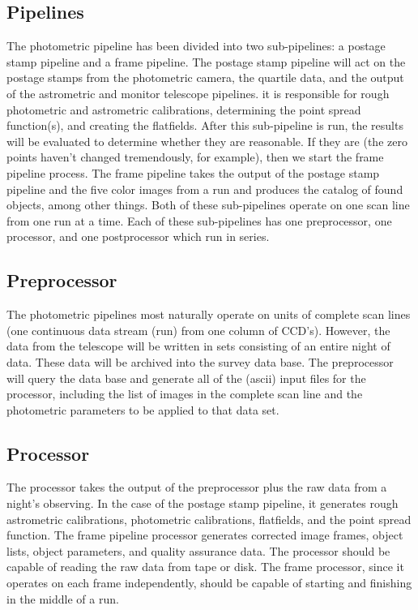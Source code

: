 \subsection{Pipelines}

	The photometric pipeline has been divided into two sub-pipelines:
a postage stamp pipeline and a frame pipeline.  The postage stamp pipeline
will act on the postage stamps from the photometric camera, the quartile
data, and the output of the astrometric and monitor telescope pipelines.
it is responsible for rough photometric and astrometric calibrations,
determining the point spread function(s), and creating the flatfields.
After this sub-pipeline is run, the results will be evaluated to determine
whether they are reasonable.  If they are (the zero points haven't changed
tremendously, for example), then we start the frame pipeline process.
The frame pipeline takes the output of the postage stamp pipeline and the
five color images from a run and produces the catalog of found objects,
among other things.  Both of these sub-pipelines operate on one scan line
from one run at a time.  Each of these sub-pipelines has one preprocessor,
one processor, and one postprocessor which run in series.

\subsection{Preprocessor}

	The photometric pipelines most naturally operate on units of
complete scan lines (one continuous data stream (run) from one column
of CCD's).  However, the data from the telescope will be written
in sets consisting of an entire night of data.  These data will be
archived into the survey data base.  The preprocessor
will query the data base and generate all of the (ascii) input files
for the processor, including the list of images in the complete
scan line and the photometric parameters to be applied to that
data set.

\subsection{Processor}

	The processor takes the output of the preprocessor plus the
raw data from a night's observing.  In the case of the postage stamp
pipeline, it generates rough astrometric calibrations, photometric
calibrations, flatfields, and the point spread function.  The frame
pipeline processor generates corrected image frames,
object lists, object parameters, and quality assurance data.  The processor 
should be capable of reading the raw data from tape or disk.  The frame
processor, since it operates on each frame independently, should be 
capable of starting and finishing in the middle of a run.

